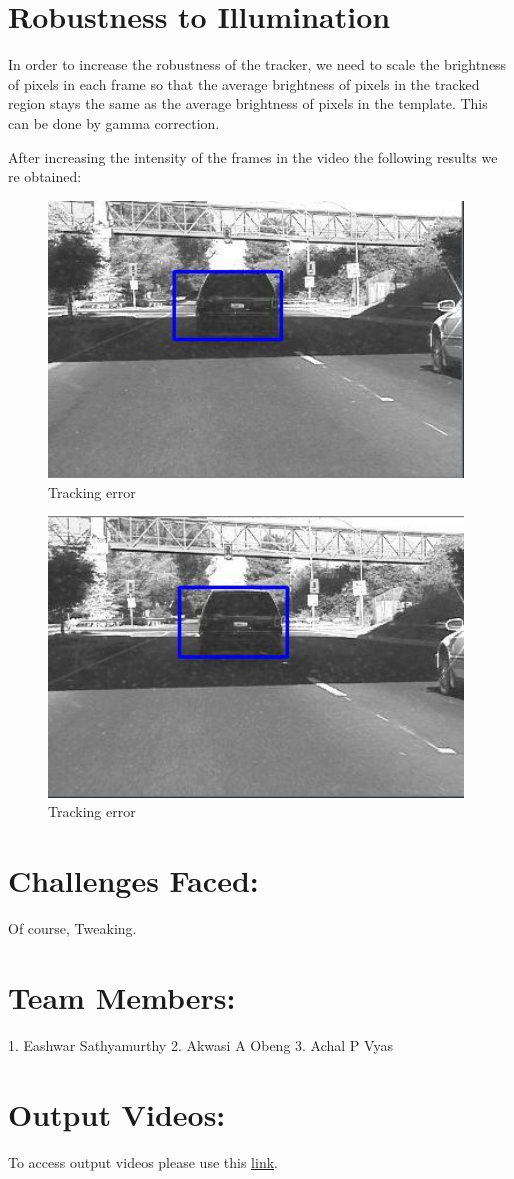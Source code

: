 \documentclass[12pt]{article}
\begin{document}
\section{Robustness to Illumination}
In order to increase the robustness of the tracker, we need to scale the brightness of pixels in each frame so that the average brightness of pixels in the tracked region stays the same as the average brightness of pixels in the template. This can be done by gamma correction.

After increasing the intensity of the frames in the video the following results we re obtained:
\begin{figure}[h]
    \centering
    \includegraphics[width=11cm]{trackcar4}
    \caption{Tracking error}
    \label{fig:Tracking error}
\end{figure}

\begin{figure}[h]
    \centering
    \includegraphics[width=11cm]{trackcar5}
    \caption{Tracking error}
    \label{fig:Tracking error}
\end{figure}

\section{Challenges Faced:}
Of course, Tweaking.
\section{Team Members:}
1. Eashwar Sathyamurthy
2. Akwasi A Obeng
3. Achal P Vyas
\section{Output Videos:}
To access output videos please use this \href{https://drive.google.com/drive/folders/1nbAUx-p-eyOWts9neJgAPA8YATY4ekmI?usp=sharing}{\underline{link}}.
\end{document}
